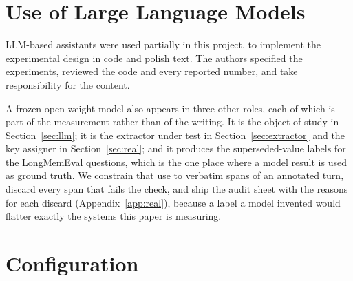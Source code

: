 \documentclass{article} %
\begin{document}
\section*{Use of Large Language Models}

LLM-based assistants were used partially in this project, to implement the experimental design in code and polish text. The authors specified the experiments, reviewed the code and every reported number, and take responsibility for the content.

A frozen open-weight model also appears in three other roles, each of which is part of the measurement rather than of the writing. It is the object of study in Section~\ref{sec:llm}; it is the extractor under test in Section~\ref{sec:extractor} and the key assigner in Section~\ref{sec:real}; and it produces the superseded-value labels for the LongMemEval questions, which is the one place where a model result is used as ground truth. We constrain that use to verbatim spans of an annotated turn, discard every span that fails the check, and ship the audit sheet with the reasons for each discard (Appendix~\ref{app:real}), because a label a model invented would flatter exactly the systems this paper is measuring.




\appendix

\section{Configuration}
\label{app:config}
\end{document}
